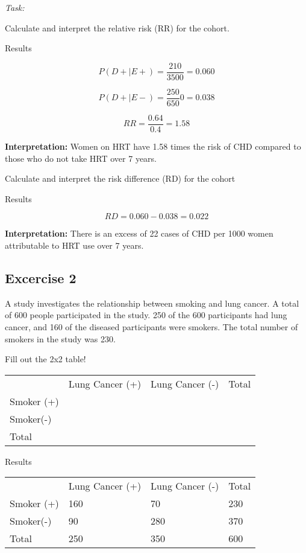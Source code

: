 \documentclass[
  letterpaper,
  paper=6in:9in,
  pagesize=pdftex,
  headinclude=on,
  footinclude=on,
  12pt]{scrbook}
\begin{document}
\emph{Task:}

Calculate and interpret the relative risk (RR) for the cohort.

Results

\[
P(D+ \mid E+)= \frac{210}{3500} = 0.060
\]

\[
P(D+ \mid E-)= \frac{250}{650}0 = 0.038
\]

\[
RR= \frac{0.64}{0.4} = 1.58
\]

\textbf{Interpretation:} Women on HRT have 1.58 times the risk of CHD
compared to those who do not take HRT over 7 years.

Calculate and interpret the risk difference (RD) for the cohort

Results

\[
RD= 0.060 - 0.038 = 0.022
\]

\textbf{Interpretation:} There is an excess of 22 cases of CHD per 1000
women attributable to HRT use over 7 years.

\hypertarget{excercise-2}{%
\subsection{Excercise 2}\label{excercise-2}}

A study investigates the relationship between smoking and lung cancer. A
total of 600 people participated in the study. 250 of the 600
participants had lung cancer, and 160 of the diseased participants were
smokers. The total number of smokers in the study was 230.

Fill out the 2x2 table!

\begin{longtable}[]{@{}llll@{}}
\toprule\noalign{}
\endhead
\bottomrule\noalign{}
\endlastfoot
& Lung Cancer (+) & Lung Cancer (-) & Total \\
Smoker (+) & & & \\
Smoker(-) & & & \\
Total & & & \\
\end{longtable}

Results

\begin{longtable}[]{@{}llll@{}}
\toprule\noalign{}
\endhead
\bottomrule\noalign{}
\endlastfoot
& Lung Cancer (+) & Lung Cancer (-) & Total \\
Smoker (+) & 160 & 70 & 230 \\
Smoker(-) & 90 & 280 & 370 \\
Total & 250 & 350 & 600 \\
\end{longtable}
\end{document}
